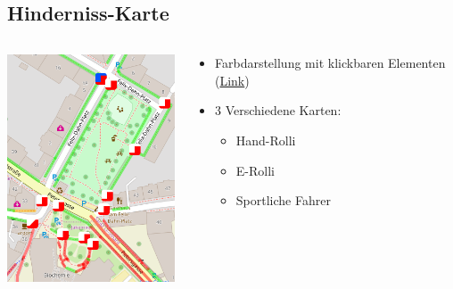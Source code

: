 \documentclass{beamer}
\begin{document}
\subsection{Hinderniss-Karte}

\begin{frame}{}

  \begin{columns}[c]

    \begin{column}[T]{.6\textwidth}
      \begin{center}
      \vspace{-0.3cm}
      \includegraphics[width=5.5cm]{hindernisse.png}
      \end{center}

    \end{column}
    \begin{column}[T]{.4\textwidth}

      \begin{itemize}
      \vspace{1cm}
          \item Farbdarstellung mit klickbaren Elementen (\href{http://species.github.io/wheelchair-obstacles/normal.html\#18/47.06588/15.45369}{Link})

      \vspace{1cm}

            \item 3 Verschiedene Karten:

              \begin{itemize}
                \item Hand-Rolli
                \item E-Rolli
                \item Sportliche Fahrer
              \end{itemize}
        \end{itemize}

    \end{column}
  \end{columns}

\end{frame}
\end{document}
